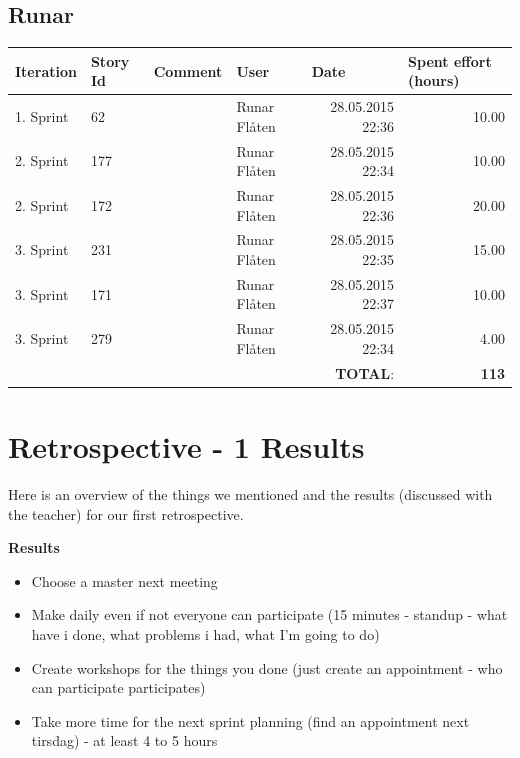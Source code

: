 \documentclass[a4paper]{article}
\begin{document}
\begin{landscape}
\subsection{Runar}
\begin{tabular}{|l|l|l|l|r|r|}
\hline
\textbf{Iteration} & \textbf{Story Id} & \textbf{Comment} & \textbf{User} & \multicolumn{1}{l|}{\textbf{Date}} & \multicolumn{1}{l|}{\textbf{Spent effort (hours)}} \\ \hline
1. Sprint & 62 &  & Runar Flåten & 28.05.2015 22:36 & 10.00 \\ \hline
2. Sprint & 177 &  & Runar Flåten & 28.05.2015 22:34 & 10.00 \\ \hline
2. Sprint & 172 &  & Runar Flåten & 28.05.2015 22:36 & 20.00 \\ \hline
3. Sprint & 231 &  & Runar Flåten & 28.05.2015 22:35 & 15.00 \\ \hline
3. Sprint & 171 &  & Runar Flåten & 28.05.2015 22:37 & 10.00 \\ \hline
3. Sprint & 279 &  & Runar Flåten & 28.05.2015 22:34 & 4.00 \\ \hline
 & & & &\textbf{TOTAL}: & \textbf{113} \\ \hline
\end{tabular}


\end{landscape}


\section{Retrospective - 1 Results}
\label{rep:retro1}

Here is an overview of the things we mentioned and the results (discussed with the teacher) for our first retrospective.

\textbf{Results}

\begin{itemize}
	\item Choose a master next meeting
	\item Make daily even if not everyone can participate (15 minutes - standup - what have i done, what problems i had, what I'm going to do)
	\item Create workshops for the things you done (just create an appointment - who can participate participates)
	\item Take more time for the next sprint planning (find an appointment next tirsdag) - at least 4 to 5 hours
\end{itemize}
\end{document}

